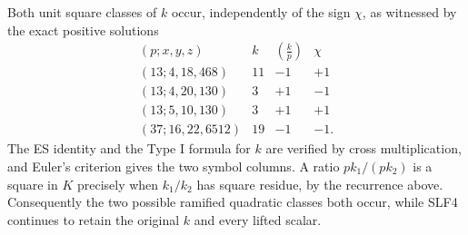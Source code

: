 Both unit square classes of $k$ occur, independently of the sign
$\chi$, as witnessed by the exact positive solutions
\[
\begin{array}{c|c|c|c}
 (p;x,y,z)&k&\left(\frac{k}{p}\right)&\chi\\\hline
 (13;4,18,468)&11&-1&+1\\
 (13;4,20,130)&3&+1&-1\\
 (13;5,10,130)&3&+1&+1\\
 (37;16,22,6512)&19&-1&-1.
\end{array}                                                    \tag{SLF18}
\]
The ES identity and the Type I formula for $k$ are verified by
cross multiplication, and Euler's criterion gives the two symbol
columns. A ratio $pk_1/(pk_2)$ is a square in $K$ precisely when
$k_1/k_2$ has square residue, by the recurrence above. Consequently
the two possible ramified quadratic classes both occur, while
SLF4 continues to retain the original $k$ and every lifted scalar.


